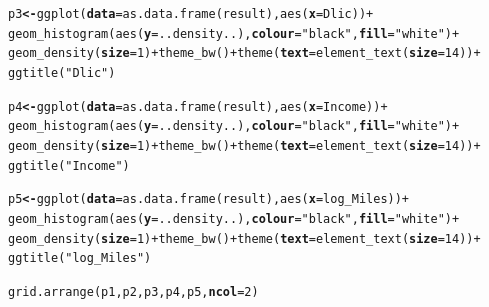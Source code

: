 \documentclass[12pt,oneside,a4paper]{article}\usepackage[]{graphicx}\usepackage[]{xcolor}
\makeatletter
\newcommand{\hlnum}[1]{\textcolor[rgb]{0,0,0}{#1}}%
\newcommand{\hlstr}[1]{\textcolor[rgb]{0,0,1}{#1}}%
\newcommand{\hlopt}[1]{\textcolor[rgb]{0,0,0}{#1}}%
\newcommand{\hlstd}[1]{\textcolor[rgb]{0,0,0}{#1}}%
\newcommand{\hlkwb}[1]{\textcolor[rgb]{0.498,0,0.333}{\textbf{#1}}}%
\newcommand{\hlkwc}[1]{\textcolor[rgb]{0.498,0,0.333}{\textbf{#1}}}%
\newcommand{\hlkwd}[1]{\textcolor[rgb]{0,0,0}{#1}}%
\newenvironment{kframe}{%
 \def\at@end@of@kframe{}%
 \ifinner\ifhmode%
  \def\at@end@of@kframe{\end{minipage}}%
  \begin{minipage}{\columnwidth}%
 \fi\fi%
 \def\FrameCommand##1{\hskip\@totalleftmargin \hskip-\fboxsep
 \colorbox{shadecolor}{##1}\hskip-\fboxsep
     \hskip-\linewidth \hskip-\@totalleftmargin \hskip\columnwidth}%
 \MakeFramed {\advance\hsize-\width
   \@totalleftmargin\z@ \linewidth\hsize
   \@setminipage}}%
 {\par\unskip\endMakeFramed%
 \at@end@of@kframe}
\newenvironment{knitrout}{}{} %
\makeatother
\begin{document}
\begin{knitrout}
\begin{kframe}
\begin{alltt}
\hlstd{p3} \hlkwb{<-} \hlkwd{ggplot}\hlstd{(}\hlkwc{data} \hlstd{=} \hlkwd{as.data.frame}\hlstd{(result),} \hlkwd{aes}\hlstd{(}\hlkwc{x} \hlstd{= Dlic))} \hlopt{+}
    \hlkwd{geom_histogram}\hlstd{(}\hlkwd{aes}\hlstd{(}\hlkwc{y} \hlstd{= ..density..),} \hlkwc{colour} \hlstd{=} \hlstr{"black"}\hlstd{,} \hlkwc{fill} \hlstd{=} \hlstr{"white"}\hlstd{)} \hlopt{+}
    \hlkwd{geom_density}\hlstd{(}\hlkwc{size} \hlstd{=} \hlnum{1}\hlstd{)} \hlopt{+} \hlkwd{theme_bw}\hlstd{()} \hlopt{+} \hlkwd{theme}\hlstd{(}\hlkwc{text} \hlstd{=} \hlkwd{element_text}\hlstd{(}\hlkwc{size} \hlstd{=} \hlnum{14}\hlstd{))} \hlopt{+}
    \hlkwd{ggtitle}\hlstd{(}\hlstr{"Dlic"}\hlstd{)}

\hlstd{p4} \hlkwb{<-} \hlkwd{ggplot}\hlstd{(}\hlkwc{data} \hlstd{=} \hlkwd{as.data.frame}\hlstd{(result),} \hlkwd{aes}\hlstd{(}\hlkwc{x} \hlstd{= Income))} \hlopt{+}
    \hlkwd{geom_histogram}\hlstd{(}\hlkwd{aes}\hlstd{(}\hlkwc{y} \hlstd{= ..density..),} \hlkwc{colour} \hlstd{=} \hlstr{"black"}\hlstd{,} \hlkwc{fill} \hlstd{=} \hlstr{"white"}\hlstd{)} \hlopt{+}
    \hlkwd{geom_density}\hlstd{(}\hlkwc{size} \hlstd{=} \hlnum{1}\hlstd{)} \hlopt{+} \hlkwd{theme_bw}\hlstd{()} \hlopt{+} \hlkwd{theme}\hlstd{(}\hlkwc{text} \hlstd{=} \hlkwd{element_text}\hlstd{(}\hlkwc{size} \hlstd{=} \hlnum{14}\hlstd{))} \hlopt{+}
    \hlkwd{ggtitle}\hlstd{(}\hlstr{"Income"}\hlstd{)}

\hlstd{p5} \hlkwb{<-} \hlkwd{ggplot}\hlstd{(}\hlkwc{data} \hlstd{=} \hlkwd{as.data.frame}\hlstd{(result),} \hlkwd{aes}\hlstd{(}\hlkwc{x} \hlstd{= log_Miles))} \hlopt{+}
    \hlkwd{geom_histogram}\hlstd{(}\hlkwd{aes}\hlstd{(}\hlkwc{y} \hlstd{= ..density..),} \hlkwc{colour} \hlstd{=} \hlstr{"black"}\hlstd{,} \hlkwc{fill} \hlstd{=} \hlstr{"white"}\hlstd{)} \hlopt{+}
    \hlkwd{geom_density}\hlstd{(}\hlkwc{size} \hlstd{=} \hlnum{1}\hlstd{)} \hlopt{+} \hlkwd{theme_bw}\hlstd{()} \hlopt{+} \hlkwd{theme}\hlstd{(}\hlkwc{text} \hlstd{=} \hlkwd{element_text}\hlstd{(}\hlkwc{size} \hlstd{=} \hlnum{14}\hlstd{))} \hlopt{+}
    \hlkwd{ggtitle}\hlstd{(}\hlstr{"log_Miles"}\hlstd{)}

\hlkwd{grid.arrange}\hlstd{(p1, p2, p3, p4, p5,} \hlkwc{ncol}\hlstd{=}\hlnum{2}\hlstd{)}
\end{alltt}
\end{kframe}


\end{knitrout}
\end{document}
